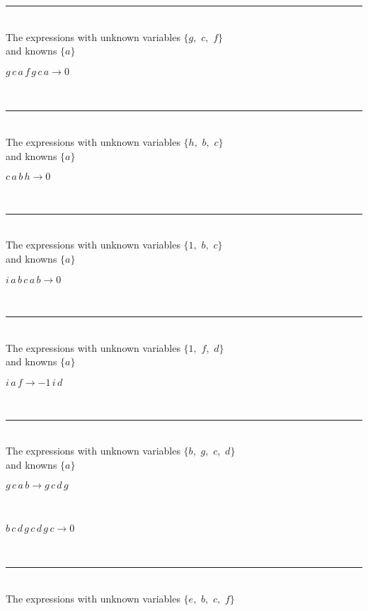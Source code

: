 \rule[3pt]{6in}{.7pt}\\
The expressions with unknown variables $\{g,
$ $
c,
$ $
f\}$\\
and knowns $\{a\}$\smallskip\\
\begin{minipage}{6in}
$
g\,
 c\,
 a\,
 f\,
 g\,
 c\,
 a\rightarrow 0
$
\end{minipage}\\
\rule[3pt]{6in}{.7pt}\\
The expressions with unknown variables $\{h,
$ $
b,
$ $
c\}$\\
and knowns $\{a\}$\smallskip\\
\begin{minipage}{6in}
$
c\,
 a\,
 b\,
 h\rightarrow 0
$
\end{minipage}\\
\rule[3pt]{6in}{.7pt}\\
The expressions with unknown variables $\{1,
$ $
b,
$ $
c\}$\\
and knowns $\{a\}$\smallskip\\
\begin{minipage}{6in}
$
i\,
 a\,
 b\,
 c\,
 a\,
 b\rightarrow 0
$
\end{minipage}\\
\rule[3pt]{6in}{.7pt}\\
The expressions with unknown variables $\{1,
$ $
f,
$ $
d\}$\\
and knowns $\{a\}$\smallskip\\
\begin{minipage}{6in}
$
i\,
 a\,
 f\rightarrow -1\,
 i\,
 d
$
\end{minipage}\\
\rule[3pt]{6in}{.7pt}\\
The expressions with unknown variables $\{b,
$ $
g,
$ $
c,
$ $
d\}$\\
and knowns $\{a\}$\smallskip\\
\begin{minipage}{6in}
$
g\,
 c\,
 a\,
 b\rightarrow g\,
 c\,
 d\,
 g
$
\end{minipage}\medskip \\
\begin{minipage}{6in}
$
b\,
 c\,
 d\,
 g\,
 c\,
 d\,
 g\,
 c\rightarrow 0
$
\end{minipage}\\
\rule[3pt]{6in}{.7pt}\\
The expressions with unknown variables $\{e,
$ $
b,
$ $
c,
$ $
f\}$\\
